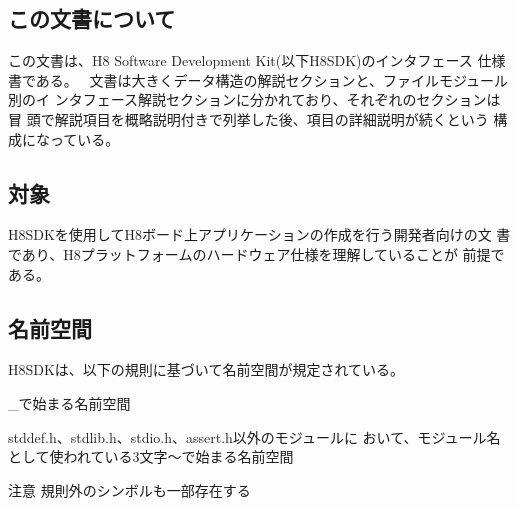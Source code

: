 \hypertarget{index_abstract}{}\subsection{この文書について}\label{index_abstract}
この文書は、\+H8 Software Development Kit(以下\+H8\+S\+D\+K)のインタフェース 仕様書である。~\newline
文書は大きくデータ構造の解説セクションと、ファイルモジュール別のイ ンタフェース解説セクションに分かれており、それぞれのセクションは冒 頭で解説項目を概略説明付きで列挙した後、項目の詳細説明が続くという 構成になっている。\hypertarget{index_target}{}\subsection{対象}\label{index_target}
H8\+S\+D\+Kを使用して\+H8ボード上アプリケーションの作成を行う開発者向けの文 書であり、\+H8プラットフォームのハードウェア仕様を理解していることが 前提である。\hypertarget{index_namespace}{}\subsection{名前空間}\label{index_namespace}
H8\+S\+D\+Kは、以下の規則に基づいて名前空間が規定されている。 \begin{DoxyItemize}
\item \textquotesingle{}\+\_\+\textquotesingle{}で始まる名前空間 \item stddef.\+h、stdlib.\+h、stdio.\+h、assert.\+h以外のモジュールに おいて、モジュール名として使われている3文字〜で始まる名前空間\end{DoxyItemize}
\begin{DoxyAttention}{注意}
規則外のシンボルも一部存在する 
\end{DoxyAttention}
